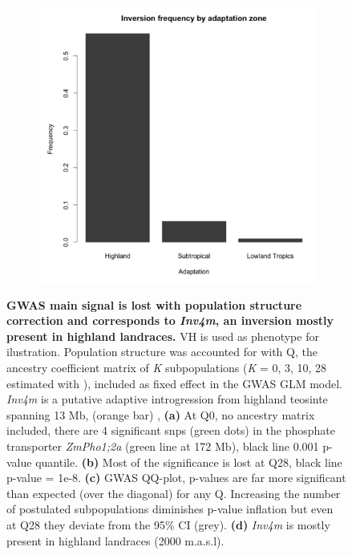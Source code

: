\documentclass[10pt,letterpaper]{article}
\begin{document}
\begin{figure}[p]
\begin{subfigure}[t]{0.45\textwidth}
   \includegraphics[width=\linewidth]{fig6d.png}
    \caption{}
       \bigskip
\end{subfigure}
\caption{\textbf{GWAS main signal is lost with population structure correction and corresponds to \textit{Inv4m}, an inversion mostly present in highland landraces.} VH is used as phenotype for ilustration. Population structure was accounted for with Q,  the ancestry coefficient matrix of \textit{K} subpopulations (\textit{K} = 0, 3, 10, 28 estimated with \cite{alexander2009}), included as fixed effect in the GWAS GLM model. \textit{Inv4m} is a putative adaptive introgression from highland teosinte spanning 13 Mb, (orange bar) \cite{pyhajarvi2013},  \textbf{(a)} At Q0, no ancestry matrix included, there are 4  significant snps (green dots) in the phosphate transporter \textit{ZmPho1;2a} \cite{salazar-vidal2016} (green line at 172 Mb),  black line 0.001 p-value quantile. \textbf{(b)} Most of the significance is lost at Q28,  black line p-value = 1e-8. \textbf{(c)} GWAS QQ-plot, p-values are far more significant than expected (over the diagonal) for any Q. Increasing the number of postulated subpopulations diminishes p-value inflation but even at Q28 they deviate from the 95\% CI (grey). \textbf{(d)}  \textit{Inv4m} is mostly present in highland landraces (2000 m.a.s.l)\cite{romeronavarro2017}.}

\label{fig6}

\end{figure}
\end{document}
